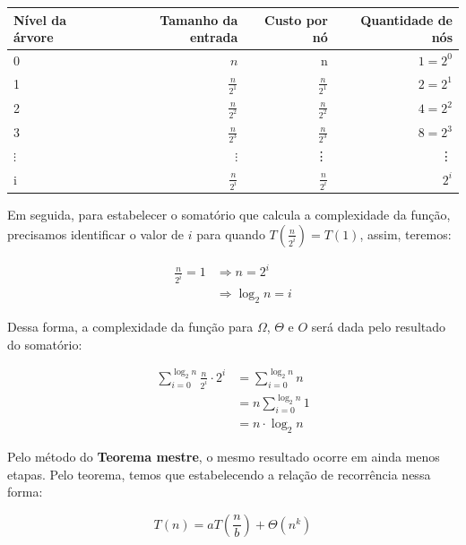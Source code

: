 \begin{table}[h!]
	\centering
	\begin{tabular}{lrrr}
		\toprule
		Nível da árvore & Tamanho da entrada & Custo por nó    & Quantidade de nós \\
		\midrule
		0               & $n$                & n               & $1 = 2^0$         \\
		1               & $\frac{n}{2^1}$    & $\frac{n}{2^1}$ & $2 = 2^1$         \\
		2               & $\frac{n}{2^2}$    & $\frac{n}{2^2}$ & $4 = 2^2$         \\
		3               & $\frac{n}{2^3}$    & $\frac{n}{2^3}$ & $8 = 2^3$         \\
		$\vdots$        & $\vdots$           & \vdots          & \vdots            \\
		i               & $\frac{n}{2^i}$    & $\frac{n}{2^i}$ & $2^i$             \\
		\bottomrule
	\end{tabular}
\end{table}
\FloatBarrier

Em seguida, para estabelecer o somatório que calcula a complexidade da função, precisamos identificar o valor de $i$ para quando $T(\frac{n}{2^i}) = T(1)$, assim, teremos:

\begin{align*}
	\frac{n}{2^i} = 1 & \Longrightarrow n = 2^i      \\
	                  & \Longrightarrow \log_2 n = i
\end{align*}

Dessa forma, a complexidade da função para $\Omega$, $\Theta$ e $O$ será dada pelo resultado do somatório:

\begin{align*}
	\sum_{i = 0}^{\log_2 n} \frac{n}{2^i} \cdot 2^i & = \sum_{i = 0}^{\log_2 n}n  \\
	                                                & = n\sum_{i = 0}^{\log_2 n}1 \\
	                                                & = n \cdot \log_2 n
\end{align*}


Pelo método do \textbf{Teorema mestre}, o mesmo resultado ocorre em ainda menos etapas. Pelo teorema, temos que estabelecendo a relação de recorrência nessa forma:

$$
	T(n) = aT\left(\frac{n}{b}\right) + \Theta\left(n^{k}\right)
$$

